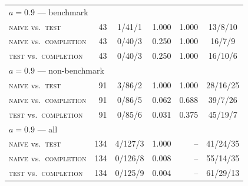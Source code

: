\begin{table}[t]
\begin{tabular}{lrcrrc}
\midrule
\multicolumn{6}{l}{$a=0.9$ --- benchmark} \\
\addlinespace[1pt]
\quad \textsc{naive} vs.\ \textsc{test} & 43 & 1/41/1 & 1.000 & 1.000 & 13/8/10 \\
\quad \textsc{naive} vs.\ \textsc{completion} & 43 & 0/40/3 & 0.250 & 1.000 & 16/7/9 \\
\quad \textsc{test} vs.\ \textsc{completion} & 43 & 0/40/3 & 0.250 & 1.000 & 16/10/6 \\
\midrule
\multicolumn{6}{l}{$a=0.9$ --- non-benchmark} \\
\addlinespace[1pt]
\quad \textsc{naive} vs.\ \textsc{test} & 91 & 3/86/2 & 1.000 & 1.000 & 28/16/25 \\
\quad \textsc{naive} vs.\ \textsc{completion} & 91 & 0/86/5 & 0.062 & 0.688 & 39/7/26 \\
\quad \textsc{test} vs.\ \textsc{completion} & 91 & 0/85/6 & 0.031 & 0.375 & 45/19/7 \\
\midrule
\multicolumn{6}{l}{$a=0.9$ --- all} \\
\addlinespace[1pt]
\quad \textsc{naive} vs.\ \textsc{test} & 134 & 4/127/3 & 1.000 & -- & 41/24/35 \\
\quad \textsc{naive} vs.\ \textsc{completion} & 134 & 0/126/8 & 0.008 & -- & 55/14/35 \\
\quad \textsc{test} vs.\ \textsc{completion} & 134 & 0/125/9 & 0.004 & -- & 61/29/13 \\
\bottomrule
\end{tabular}
\end{table}
